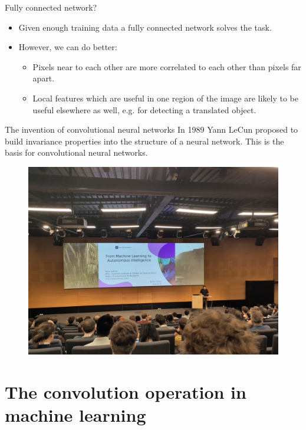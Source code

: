 \documentclass{beamer}
\begin{document}
	\begin{frame}{Fully connected network?}
	\begin{itemize}
		\item Given enough training data a fully connected network solves the task. %
		\item However, we can do better: %
		\begin{itemize}
			\item Pixels near to each other are more correlated to each other than pixels far apart. %
			\item Local features which are useful in one region of the image are likely to be useful elsewhere as well, e.g. for detecting a translated object.
		\end{itemize} %
	\end{itemize} 
	\end{frame}

    \begin{frame}{The invention of convolutional neural networks}
        In 1989 Yann LeCun proposed to build invariance properties into the structure of a neural network. This is the basis for convolutional neural networks.
				\begin{figure}%
				\centering
				\includegraphics[width=.6\linewidth]{figures/IMG_20220923_090433.jpg}
				\end{figure}   
    \end{frame}
		
    \section{The convolution operation in machine learning}
\end{document}
